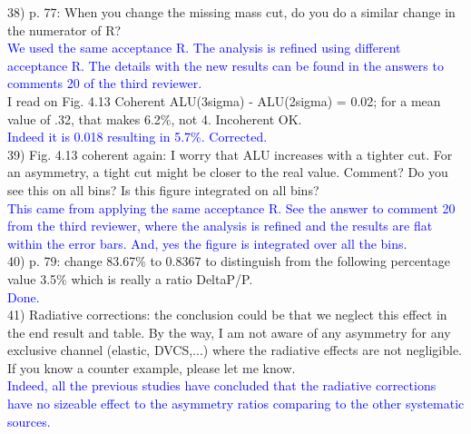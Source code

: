 38) p. 77: When you change the missing mass cut, do you do a similar change in 
the numerator of R? \\
\textcolor{blue}{We used the same acceptance R. The analysis is refined using 
different acceptance R. The details with the new results can be found in the 
answers to comments 20 of the third reviewer.  }\\

I read on Fig. 4.13 Coherent ALU(3sigma) - ALU(2sigma) = 0.02; for a mean value 
of .32, that makes 6.2$\%$, not 4. Incoherent OK.\\
\textcolor{blue}{ Indeed it is 0.018 resulting in 5.7$\%$. Corrected.}\\

39) Fig. 4.13 coherent again: I worry that ALU increases with a tighter cut.  
For an asymmetry, a tight cut might be closer to the real value. Comment?  Do 
you see this on all bins? Is this figure integrated on all bins?\\
\textcolor{blue}{ This came from applying the same acceptance R. See the answer 
to comment 20 from the third reviewer, where the analysis is refined and the 
results are flat within the error bars. And, yes the figure is integrated over all the 
bins.  }\\

40) p. 79: change 83.67$\%$ to 0.8367 to distinguish from the following 
percentage value 3.5$\%$ which is really a ratio DeltaP/P.\\
\textcolor{blue}{ Done.}\\

41) Radiative corrections: the conclusion could be that we neglect this effect in 
the end result and table. By the way, I am not aware of any asymmetry for any 
exclusive channel (elastic, DVCS,...) where the radiative effects are not 
negligible. If you know a counter example, please let me know. \\
\textcolor{blue}{ Indeed, all the previous studies have concluded that the radiative 
corrections have no sizeable effect to the asymmetry ratios comparing to the 
other systematic sources. }\\


